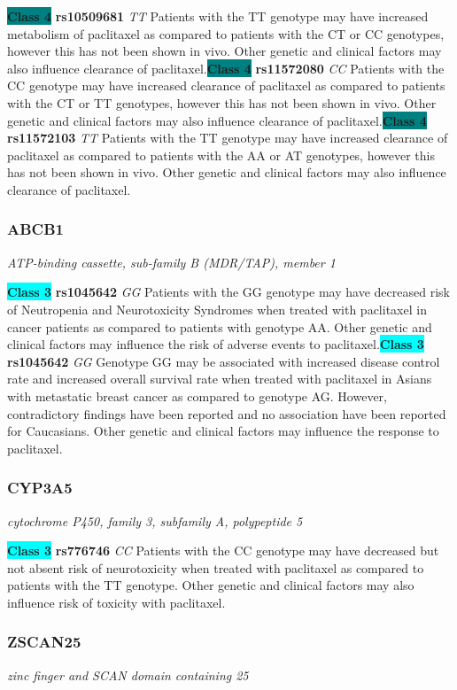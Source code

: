 \documentclass{report}
\begin{document}
\textbf{\colorbox{teal} {Class 4}} \textbf{ rs10509681 } \textit{ TT }
Patients with the TT genotype may have increased metabolism of paclitaxel as compared to patients with the CT or CC genotypes, however this has not been shown in vivo. Other genetic and clinical factors may also influence clearance of paclitaxel.\newline\textbf{\colorbox{teal} {Class 4}} \textbf{ rs11572080 } \textit{ CC }
Patients with the CC genotype may have increased clearance of paclitaxel as compared to patients with the CT or TT genotypes, however this has not been shown in vivo. Other genetic and clinical factors may also influence clearance of paclitaxel.\newline\textbf{\colorbox{teal} {Class 4}} \textbf{ rs11572103 } \textit{ TT }
Patients with the TT genotype may have increased clearance of paclitaxel as compared to patients with the AA or AT genotypes, however this has not been shown in vivo. Other genetic and clinical factors may also influence clearance of paclitaxel.\newline\subsubsection{ ABCB1 }
\textit{ ATP-binding cassette, sub-family B (MDR/TAP), member 1 }

\textbf{\colorbox{cyan} {Class 3}} \textbf{ rs1045642 } \textit{ GG }
Patients with the GG genotype may have decreased risk of Neutropenia and Neurotoxicity Syndromes when treated with paclitaxel in cancer patients as compared to patients with genotype AA. Other genetic and clinical factors may influence the risk of adverse events to paclitaxel.\newline\textbf{\colorbox{cyan} {Class 3}} \textbf{ rs1045642 } \textit{ GG }
Genotype GG may be associated with increased disease control rate and increased overall survival rate when treated with paclitaxel in Asians with metastatic breast cancer as compared to genotype AG. However, contradictory findings have been reported and no association have been reported for Caucasians. Other genetic and clinical factors may influence the response to paclitaxel.\newline\subsubsection{ CYP3A5 }
\textit{ cytochrome P450, family 3, subfamily A, polypeptide 5 }

\textbf{\colorbox{cyan} {Class 3}} \textbf{ rs776746 } \textit{ CC }
Patients with the CC genotype may have decreased but not absent risk of neurotoxicity when treated with paclitaxel as compared to patients with the TT genotype. Other genetic and clinical factors may also influence risk of toxicity with paclitaxel.\newline\subsubsection{ ZSCAN25 }
\textit{ zinc finger and SCAN domain containing 25 }
\end{document}
